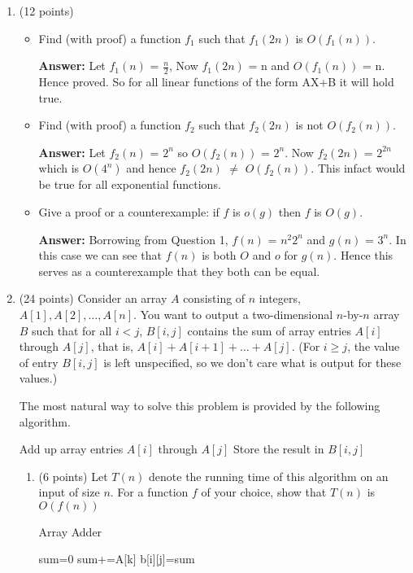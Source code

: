 \documentclass[11pt]{article}
\newcommand{\ans}{\textbf{Answer: }}
\begin{document}
\begin{enumerate}
\bigskip

\item (12 points)
\begin{itemize}
\item Find (with proof) a function $f_1$ such that $f_1(2n)$  is $O(f_1(n))$. 

\ans Let $f_1(n)$ = $\frac{n}{2}$, Now $f_1(2n)$ = n and $O(f_1(n))$ = n. Hence proved. So for all linear functions of the form AX+B it will hold true.
\item Find (with proof) a function $f_2$ such that $f_2(2n)$  is not $O(f_2(n))$.

\ans Let $f_2(n)$ = $2^n$ so $O(f_2(n))$ = $2^n$. Now $f_2(2n)$ = $2^{2n}$ which is $O(4^n)$ and hence $f_2(2n)$ $\neq$ $O(f_2(n))$. This infact would be true for all exponential functions.
\item Give a proof or a counterexample: if $f$ is $o(g)$ then $f$ is $O(g)$.

\ans Borrowing from Question 1, $f(n)$ = $n^2 2^n$ and $g(n)$ = $3^n$. In this case we can see that $f(n)$ is both $O$ and $o$ for $g(n)$. Hence this serves as a counterexample that they both can be equal.

\end{itemize}

\bigskip

\item (24 points) Consider an array $A$ consisting of $n$ integers, $A[1], A[2], \ldots, A[n]$.
You want to output a two-dimensional $n$-by-$n$ array $B$ such that for all
$i<j$, $B[i, j]$ contains the sum of array entries $A[i]$ through $A[j]$, that is,
$A[i]+ A[i+1] + \ldots + A[j]$. (For $i \geq j$, the value of entry $B[i,j]$
is left unspecified, so we don't care what is output for these values.)

The most natural way to solve this problem is provided by the following algorithm. 
\begin{algorithmic}
\State {}
\State Add up array entries $A[i]$ through $A[j]$
\State Store the result in $B[i,j]$
\EndFor
\EndFor
\end{algorithmic}

\begin{enumerate}


\item (6 points) Let $T(n)$ denote the running time of this algorithm  on an input of size $n$. 
For a function $f$ of your choice, show that $T(n)$ is  $O(f(n))$\\
\begin{algorithm}\begin{center}
\caption{Array Adder }\label{euclid}
\begin{algorithmic}[1]
\State sum=0
\State sum+=A[k]
\EndFor
\State b[i][j]=sum
\EndFor
\EndFor
\end{algorithmic}
\end {center}
\end{algorithm}


\end{enumerate}
\end{enumerate}
\end{document}
